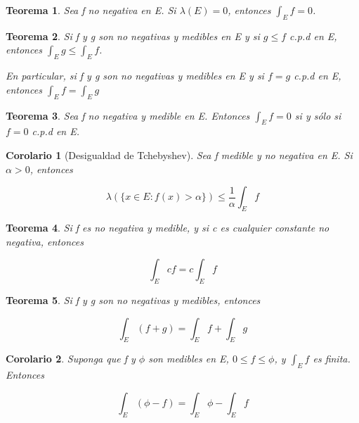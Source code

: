 \documentclass{article}
\newtheorem{theorem}{Teorema}
\newtheorem{corollary}{Corolario}
\begin{document}
\begin{theorem}
Sea f no negativa en E. Si $\lambda(E) = 0$, entonces $\int_E f = 0$.
\end{theorem}

\begin{theorem}
Si f y g son no negativas y medibles en E y si $g \leq f$ c.p.d en E, entonces $\int_E g \leq \int_E f$. 

En particular, si f y g son no negativas y medibles en E y si $f = g$ c.p.d en E, entonces $\int_E f = \int_E g$
\end{theorem}

\begin{theorem}
Sea f no negativa y medible en E. Entonces $\int_E f = 0$ si y sólo si $f = 0$ c.p.d en E.
\end{theorem}

\begin{corollary}[Desigualdad de Tchebyshev]
Sea f medible y no negativa en E. Si $\alpha > 0$, entonces 

\begin{equation*}
\lambda(\{x \in E: f(x) > \alpha\}) \leq \frac{1}{\alpha} \int_E f
\end{equation*}

\end{corollary}

\begin{theorem}
Si f es no negativa y medible, y si c es cualquier constante no negativa, entonces 

\begin{equation*}
\int_E cf = c\int_E f
\end{equation*}
\end{theorem}

\begin{theorem}
Si f y g son no negativas y medibles, entonces

\begin{equation*}
\int_E (f+g) = \int_E f + \int_E g
\end{equation*}

\end{theorem}

\begin{corollary}
Suponga que f y $\phi$ son medibles en E, $0 \leq f \leq \phi$, y $\int_E f$ es finita. Entonces

\begin{equation*}
\int_E(\phi - f) = \int_E \phi - \int_E f
\end{equation*}
\end{corollary}
\end{document}
